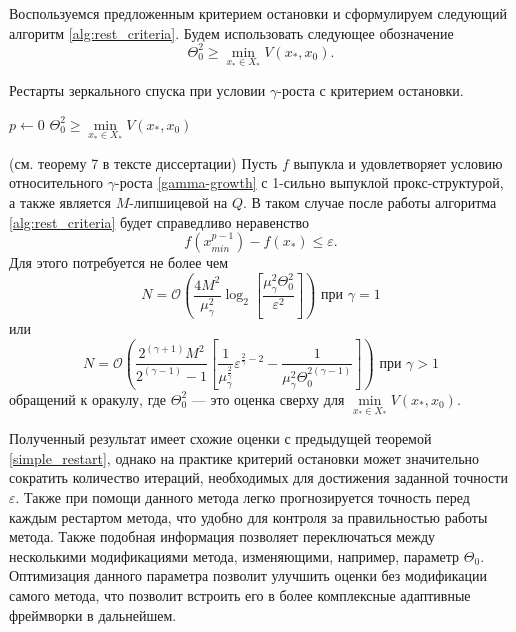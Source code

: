 Воспользуемся предложенным критерием остановки и сформулируем следующий алгоритм \ref{alg:rest_criteria}. Будем использовать следующее обозначение
\[
    \Theta_0^2 \geq \min\limits_{x_* \in X_*}{V(x_*, x_0)}.
 \]
 \begin{algorithm}[htp]
    \caption{Рестарты зеркального спуска при условии $\gamma$-роста с критерием остановки.}
    \label{alg:rest_criteria}
    $p \gets 0$\;
    $\Theta_0^2 \geq \min\limits_{x_* \in X_*}{V(x_*,x_0)}$\;
\end{algorithm}
\begin{theorem} (см. теорему 7 в тексте диссертации)
    Пусть $f$ выпукла и удовлетворяет условию относительного $\gamma$-роста \eqref{gamma-growth} с 1-сильно выпуклой прокс-структурой, а также является $M$-липшицевой на $Q$. В таком случае после работы алгоритма \ref{alg:rest_criteria} будет справедливо неравенство
    \begin{equation}
        f(x_{min}^{p-1}) - f(x_*) \leq \varepsilon.
    \end{equation}
    Для этого потребуется не более чем
    \begin{equation}
        N = \mathcal{O} \left( \frac{4 M^2}{\mu_{\gamma}^2} \log_2{\left[\frac{\mu_{\gamma}^2 \Theta_0^2}{\varepsilon^2} \right]} \right) \text{ при } \gamma = 1
    \end{equation}
    или
    \begin{equation}
        N = \mathcal{O}\left( \frac{2^{(\gamma + 1)} M^2 }{2^{(\gamma - 1)} - 1}\left[ \frac{1}{\mu_{\gamma}^{\frac{2}{\gamma}}} \varepsilon^{\frac{2}{\gamma} - 2} - \frac{1}{\mu_{\gamma}^2 \Theta_0^{2(\gamma - 1)}} \right] \right) \text{ при } \gamma > 1
    \end{equation}
    обращений к оракулу, где $\Theta_0^2$ --- это оценка сверху для $\min\limits_{x_* \in X_*}{V(x_*, x_0)}$.
\end{theorem}

Полученный результат имеет схожие оценки с предыдущей теоремой \ref{simple_restart}, однако на практике критерий остановки может значительно сократить количество итераций, необходимых для достижения заданной точности $\varepsilon$. Также при помощи данного метода легко прогнозируется точность перед каждым рестартом метода, что удобно для контроля за правильностью работы метода. Также подобная информация позволяет переключаться между несколькими модификациями метода, изменяющими, например, параметр $\Theta_0$. Оптимизация данного параметра позволит улучшить оценки без модификации самого метода, что позволит встроить его в более комплексные адаптивные фреймворки в дальнейшем. 

